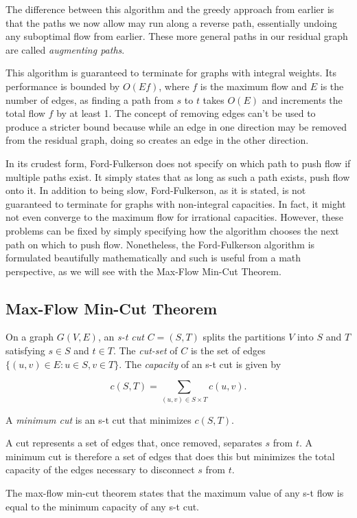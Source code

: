 The difference between this algorithm and the greedy approach from earlier is that the paths we now allow may run along a reverse path, essentially undoing any suboptimal flow from earlier. These more general paths in our residual graph are called \textit{augmenting paths}.

This algorithm is guaranteed to terminate for graphs with integral weights. Its performance is bounded by $O(Ef)$, where $f$ is the maximum flow and $E$ is the number of edges, as finding a path from $s$ to $t$ takes $O(E)$ and increments the total flow $f$ by at least 1. The concept of removing edges can't be used to produce a stricter bound because while an edge in one direction may be removed from the residual graph, doing so creates an edge in the other direction.

In its crudest form, Ford-Fulkerson does not specify on which path to push flow if multiple paths exist. It simply states that as long as such a path exists, push flow onto it. In addition to being slow, Ford-Fulkerson, as it is stated, is not guaranteed to terminate for graphs with non-integral capacities. In fact, it might not even converge to the maximum flow for irrational capacities. However, these problems can be fixed by simply specifying how the algorithm chooses the next path on which to push flow. Nonetheless, the Ford-Fulkerson algorithm is formulated beautifully mathematically and such is useful from a math perspective, as we will see with the Max-Flow Min-Cut Theorem.

\subsection{Max-Flow Min-Cut Theorem}

On a graph $G(V,E)$, an \textit{s-t cut} $C=(S,T)$ splits the partitions $V$ into $S$ and $T$ satisfying $s \in S$ and $t \in T$. The \textit{cut-set} of $C$ is the set of edges $\{(u,v) \in E : u \in S, v \in T\}$. The \textit{capacity} of an s-t cut is given by

\[c(S,T) = \sum_{(u,v) \in S \times T}c(u,v).\]

A \textit{minimum cut} is an s-t cut that minimizes $c(S,T)$.

A cut represents a set of edges that, once removed, separates $s$ from $t$. A minimum cut is therefore a set of edges that does this but minimizes the total capacity of the edges necessary to disconnect $s$ from $t$.

The max-flow min-cut theorem states that the maximum value of any s-t flow is equal to the minimum capacity of any s-t cut.

